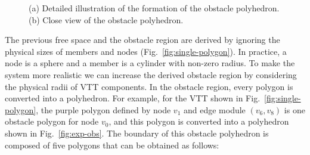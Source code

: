 \documentclass[journal]{IEEEtran}
\begin{document}
\begin{figure}[b!]
  \centering
  \hfil
  \caption{(a) Detailed illustration of the formation of the obstacle
    polyhedron. (b) Close view of the obstacle polyhedron.}
\end{figure}

The previous free space and the obstacle region are derived by
ignoring the physical sizes of members and nodes
(Fig.~\ref{fig:single-polygon}). In practice, a node is a sphere and a
member is a cylinder with non-zero radius. To make the system more
realistic we can increase the derived obstacle region by considering
the physical radii of VTT components. In the obstacle region, every
polygon is converted into a polyhedron. For example, for the VTT shown
in Fig.~\ref{fig:single-polygon}, the purple polygon defined by node
$v_1$ and edge module $(v_6, v_8)$ is one obstacle polygon for node
$v_0$, and this polygon is converted into a polyhedron shown in
Fig.~\ref{fig:exp-obs}. The boundary of this obstacle polyhedron is
composed of five polygons that can be obtained as follows:
\end{document}
